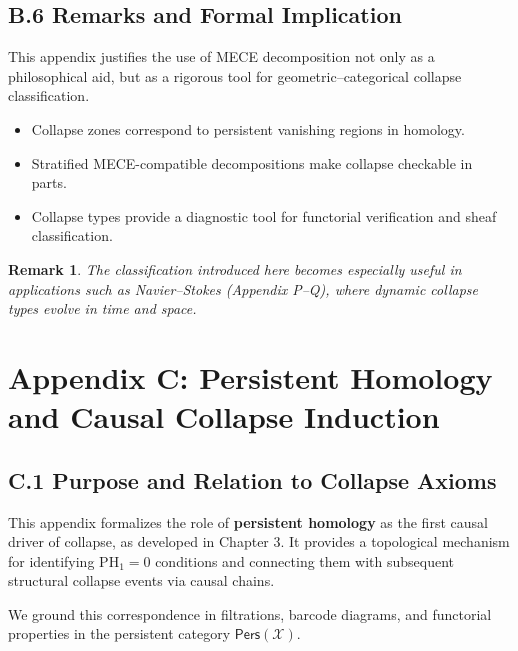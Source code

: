 \documentclass[11pt]{article}
\newtheorem{remark}[theorem]{Remark}
\begin{document}
\subsection*{B.6 Remarks and Formal Implication}

This appendix justifies the use of MECE decomposition not only as a philosophical aid,  
but as a rigorous tool for geometric–categorical collapse classification.

\begin{itemize}
  \item Collapse zones correspond to persistent vanishing regions in homology.
  \item Stratified MECE-compatible decompositions make collapse checkable in parts.
  \item Collapse types provide a diagnostic tool for functorial verification and sheaf classification.
\end{itemize}

\begin{remark}
The classification introduced here becomes especially useful in applications such as  
Navier–Stokes (Appendix P–Q), where dynamic collapse types evolve in time and space.
\end{remark}



\section*{Appendix C: Persistent Homology and Causal Collapse Induction}

\subsection*{C.1 Purpose and Relation to Collapse Axioms}

This appendix formalizes the role of \textbf{persistent homology} as the first causal driver of collapse,  
as developed in Chapter 3. It provides a topological mechanism for identifying \(\mathrm{PH}_1 = 0\)  
conditions and connecting them with subsequent structural collapse events via causal chains.

We ground this correspondence in filtrations, barcode diagrams, and functorial properties  
in the persistent category \( \mathsf{Pers}(\mathcal{X}) \).
\end{document}
